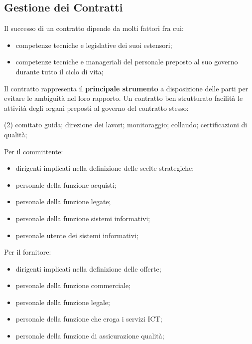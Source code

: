 \subsection{Gestione dei Contratti}\label{sub:cv_gestione_dei_contratti} %
Il successo di un contratto dipende da molti fattori fra cui:
\begin{itemize}
    \item competenze tecniche e legislative dei suoi estensori;
    \item competenze tecniche e manageriali del personale preposto al suo governo durante tutto il ciclo di vita;
\end{itemize}
Il contratto rappresenta il \textbf{principale strumento} a disposizione delle parti per evitare le ambiguità nel loro rapporto.
Un contratto ben strutturato facilità le attività degli organi preposti al governo del contratto stesso:
\begin{tasks}(2)    
    \task comitato guida;
    \task direzione dei lavori;
    \task monitoraggio;
    \task collaudo;
    \task certificazioni di qualità;
\end{tasks}
\begin{note}
    Per il committente:
    \begin{itemize}
        \item dirigenti implicati nella definizione delle scelte strategiche;
        \item personale della funzione acquisti;
        \item personale della funzione legate;
        \item personale della funzione sistemi informativi;
        \item personale utente dei sistemi informativi;
    \end{itemize}
    Per il fornitore:
    \begin{itemize}
        \item dirigenti implicati nella definizione delle offerte;
        \item personale della funzione commerciale;
        \item personale della funzione legale;
        \item personale della funzione che eroga i servizi ICT;
        \item personale della funzione di assicurazione qualità;
    \end{itemize}
\end{note}
%
